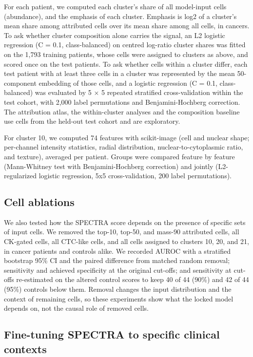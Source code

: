 \documentclass[11pt]{article}
\begin{document}
For each patient, we computed each cluster's share of all model-input cells (abundance), and the emphasis of each cluster. Emphasis is log2 of a cluster's mean share among attributed cells over its mean share among all cells, in cancers. To ask whether cluster composition alone carries the signal, an L2 logistic regression (C = 0.1, class-balanced) on centred log-ratio\cite{aitchison1982} cluster shares was fitted on the 1,793 training patients, whose cells were assigned to clusters as above, and scored once on the test patients. To ask whether cells within a cluster differ, each test patient with at least three cells in a cluster was represented by the mean 50-component embedding of those cells, and a logistic regression (C = 0.1, class-balanced) was evaluated by 5 $\times$ 5 repeated stratified cross-validation within the test cohort, with 2,000 label permutations and Benjamini-Hochberg correction. The attribution atlas, the within-cluster analyses and the composition baseline use cells from the held-out test cohort and are exploratory.

For cluster 10, we computed 74 features with scikit-image (cell and nuclear shape; per-channel intensity statistics, radial distribution, nuclear-to-cytoplasmic ratio, and texture), averaged per patient. Groups were compared feature by feature (Mann-Whitney test with Benjamini-Hochberg correction) and jointly (L2-regularized logistic regression, 5x5 cross-validation, 200 label permutations).

\subsection*{Cell ablations}

We also tested how the SPECTRA score depends on the presence of specific sets of input cells. We removed the top-10, top-50, and mass-90 attributed cells, all CK-gated cells, all CTC-like cells, and all cells assigned to clusters 10, 20, and 21, in cancer patients and controls alike. We recorded AUROC with a stratified bootstrap 95\% CI and the paired difference from matched random removal; sensitivity and achieved specificity at the original cut-offs; and sensitivity at cut-offs re-estimated on the altered control scores to keep 40 of 44 (90\%) and 42 of 44 (95\%) controls below them. Removal changes the input distribution and the context of remaining cells, so these experiments show what the locked model depends on, not the causal role of removed cells.

\subsection*{Fine-tuning SPECTRA to specific clinical contexts}
\end{document}
